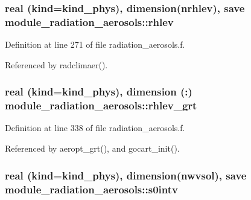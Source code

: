 \subsubsection[{\texorpdfstring{rhlev}{rhlev}}]{\setlength{\rightskip}{0pt plus 5cm}real (kind=kind\+\_\+phys), dimension(nrhlev), save module\+\_\+radiation\+\_\+aerosols\+::rhlev\hspace{0.3cm}{\ttfamily [private]}}\hypertarget{group__module__radiation__aerosols_ga6aa3218393ea05cab77ab7867cfeab90}{}\label{group__module__radiation__aerosols_ga6aa3218393ea05cab77ab7867cfeab90}


Definition at line 271 of file radiation\+\_\+aerosols.\+f.



Referenced by radclimaer().

\subsubsection[{\texorpdfstring{rhlev\+\_\+grt}{rhlev_grt}}]{\setlength{\rightskip}{0pt plus 5cm}real (kind=kind\+\_\+phys), dimension (\+:) module\+\_\+radiation\+\_\+aerosols\+::rhlev\+\_\+grt\hspace{0.3cm}{\ttfamily [private]}}\hypertarget{group__module__radiation__aerosols_gace40d50e36de1fc08c4ff35f6d8dbda9}{}\label{group__module__radiation__aerosols_gace40d50e36de1fc08c4ff35f6d8dbda9}


Definition at line 338 of file radiation\+\_\+aerosols.\+f.



Referenced by aeropt\+\_\+grt(), and gocart\+\_\+init().

\subsubsection[{\texorpdfstring{s0intv}{s0intv}}]{\setlength{\rightskip}{0pt plus 5cm}real (kind=kind\+\_\+phys), dimension(nwvsol), save module\+\_\+radiation\+\_\+aerosols\+::s0intv\hspace{0.3cm}{\ttfamily [private]}}\hypertarget{group__module__radiation__aerosols_gaed8bb8a8bc26d72a6c3d31ed4430941f}{}\label{group__module__radiation__aerosols_gaed8bb8a8bc26d72a6c3d31ed4430941f}


